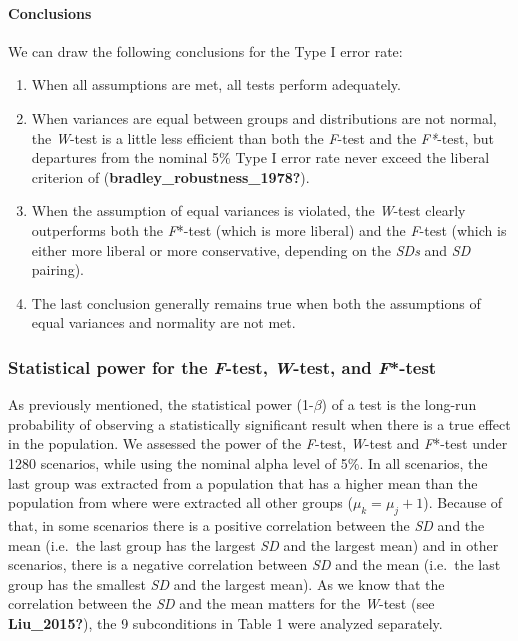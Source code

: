 \documentclass[
  english,
  man]{apa6}
\providecommand{\tightlist}{%
  \setlength{\itemsep}{0pt}\setlength{\parskip}{0pt}}
\let\oldparagraph\paragraph
\renewcommand{\paragraph}[1]{\oldparagraph{#1}\mbox{}}
\begin{document}
\hypertarget{conclusions}{%
\paragraph{Conclusions}\label{conclusions}}

We can draw the following conclusions for the Type I error rate:

\begin{enumerate}
\def\labelenumi{\arabic{enumi})}
\tightlist
\item
  When all assumptions are met, all tests perform adequately.\\
\item
  When variances are equal between groups and distributions are not normal, the \emph{W}-test is a little less efficient than both the \emph{F}-test and the \emph{F*}-test, but departures from the nominal 5\% Type I error rate never exceed the liberal criterion of (\textbf{bradley\_robustness\_1978?}).\\
\item
  When the assumption of equal variances is violated, the \emph{W}-test clearly outperforms both the \emph{F}*-test (which is more liberal) and the \emph{F}-test (which is either more liberal or more conservative, depending on the \emph{SDs} and \emph{SD} pairing).\\
\item
  The last conclusion generally remains true when both the assumptions of equal variances and normality are not met.
\end{enumerate}

\hypertarget{statistical-power-for-the-f-test-w-test-and-f-test}{%
\subsubsection{\texorpdfstring{Statistical power for the \emph{F}-test, \emph{W}-test, and \emph{F}*-test}{Statistical power for the F-test, W-test, and F*-test}}\label{statistical-power-for-the-f-test-w-test-and-f-test}}

As previously mentioned, the statistical power (1-\(\beta\)) of a test is the long-run probability of observing a statistically significant result when there is a true effect in the population. We assessed the power of the \emph{F}-test, \emph{W}-test and \emph{F}*-test under 1280 scenarios, while using the nominal alpha level of 5\%. In all scenarios, the last group was extracted from a population that has a higher mean than the population from where were extracted all other groups (\(\mu_k = \mu_j+1\)). Because of that, in some scenarios there is a positive correlation between the \emph{SD} and the mean (i.e.~the last group has the largest \emph{SD} and the largest mean) and in other scenarios, there is a negative correlation between \emph{SD} and the mean (i.e.~the last group has the smallest \emph{SD} and the largest mean). As we know that the correlation between the \emph{SD} and the mean matters for the \emph{W}-test (see \textbf{Liu\_2015?}), the 9 subconditions in Table 1 were analyzed separately.
\end{document}
